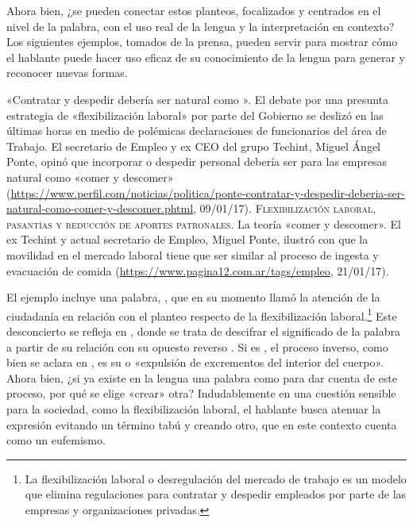 Ahora bien, ¿se pueden conectar estos planteos, focalizados y centrados en el
nivel de la palabra, con el uso real de la lengua y la interpretación en
contexto? Los siguientes ejemplos, tomados de la prensa, pueden servir para
mostrar cómo el hablante puede hacer uso eficaz de su conocimiento de la lengua
para generar y reconocer nuevas formas.

\begin{exe}
  \ex\label{ex:01-descomer}
    \begin{xlist}
      \ex\label{ex:01-descomer-a} «Contratar y despedir debería ser natural como
          ». El debate por una presunta estrategia de
          «flexibilización laboral» por parte del Gobierno se deslizó en las
          últimas horas en medio de polémicas declaraciones de funcionarios del
          área de Trabajo. El secretario de Empleo y ex CEO del grupo Techint,
          Miguel Ángel Ponte, opinó que incorporar o despedir personal debería
          ser para las empresas natural como «comer y descomer»
          (\url{https://www.perfil.com/noticias/politica/ponte-contratar-y-despedir-deberia-ser-natural-como-comer-y-descomer.phtml},
          09/01/17).
      \ex\label{ex:01-descomer-b} \textsc{Flexibilización laboral, pasantías y
          reducción de aportes patronales}. La teoría «comer y descomer». El ex
          Techint y actual secretario de Empleo, Miguel Ponte, ilustró con que
          la movilidad en el mercado laboral tiene que ser similar al proceso de
          ingesta y evacuación de comida
          (\url{https://www.pagina12.com.ar/tags/empleo},
          21/01/17).
    \end{xlist}
\end{exe}

El ejemplo  incluye una palabra, , que
en su momento llamó la atención de la ciudadanía en relación con el planteo
respecto de la flexibilización laboral.\footnote{La flexibilización laboral o
desregulación del mercado de trabajo es un modelo que elimina regulaciones
para contratar y despedir empleados por parte de las empresas y organizaciones
privadas.} Este desconcierto se refleja en , donde se
trata de descifrar el significado de la palabra a partir de su relación con su
opuesto reverso \parencite[18]{cruse2001} . Si  es
, el proceso inverso, como bien se aclara en
, es su  o «expulsión de excrementos
del interior del cuerpo». Ahora bien, ¿si ya existe en la lengua una palabra
como  para dar cuenta de este proceso, por qué se elige
«crear» otra? Indudablemente en una cuestión sensible para la sociedad, como la
flexibilización laboral, el hablante busca atenuar la expresión evitando un
término tabú y creando otro, que en este contexto cuenta como un eufemismo.

